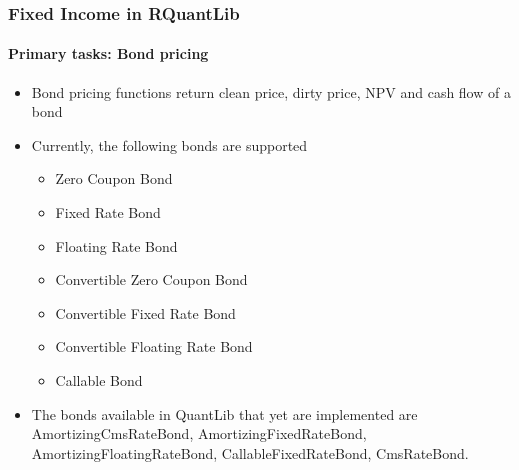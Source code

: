\documentclass[compress]{beamer}
\begin{document}
\begin{frame}
	\frametitle{Fixed Income in RQuantLib}
	\framesubtitle{Primary tasks: Bond pricing}
	\begin{itemize}
		\item Bond pricing functions return clean price, dirty price, NPV and cash flow of a bond
		\item Currently, the following bonds are supported
			\begin{itemize}
				\item Zero Coupon Bond
				\item Fixed Rate Bond
				\item Floating Rate Bond
				\item Convertible Zero Coupon Bond
				\item Convertible Fixed Rate Bond												
				\item Convertible Floating Rate Bond
				\item Callable Bond
			\end{itemize}
		\item The bonds available in QuantLib that yet are implemented are AmortizingCmsRateBond, AmortizingFixedRateBond, AmortizingFloatingRateBond, CallableFixedRateBond, CmsRateBond.
	\end{itemize}
\end{frame}
\end{document}
